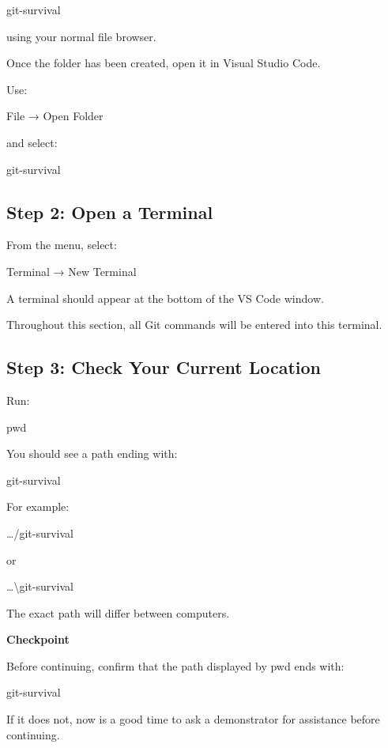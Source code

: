 \documentclass{csc2059practical}
\begin{document}
\begin{terminalplain}
git-survival
\end{terminalplain}
using your normal file browser.

Once the folder has been created, open it in Visual Studio Code.

Use:

File → Open Folder

and select:

\begin{terminalplain}
git-survival
\end{terminalplain}
\subsection{Step 2: Open a Terminal}
From the menu, select:

Terminal → New Terminal

A terminal should appear at the bottom of the VS Code window.

Throughout this section, all Git commands will be entered into this terminal.

\subsection{Step 3: Check Your Current Location}
Run:

\begin{terminalplain}
pwd
\end{terminalplain}
You should see a path ending with:

\begin{terminalplain}
git-survival
\end{terminalplain}
For example:

\ldots{}/git-survival

or

\ldots{}\textbackslash{}git-survival

The exact path will differ between computers.

\begin{reflectionbox}
\textbf{Checkpoint}\par
\medskip
Before continuing, confirm that the path displayed by pwd ends with:
\end{reflectionbox}
\begin{terminalplain}
git-survival
\end{terminalplain}
If it does not, now is a good time to ask a demonstrator for assistance before continuing.
\end{document}
